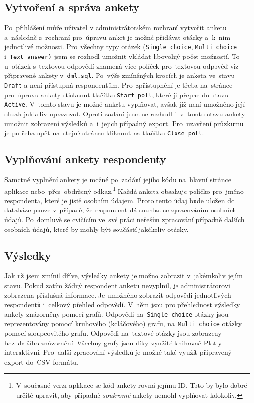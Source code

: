 \documentclass[czech]{pyt-report}
\begin{document}
\subsection{Vytvoření a správa ankety}
Po~přihlášení může uživatel v administrátorském rozhraní vytvořit anketu a~následně z~rozhraní pro~úpravu anket je možné přidávat otázky a~k~nim jednotlivé možnosti. Pro~všechny typy otázek (\texttt{Single choice}, \texttt{Multi choice} i~\texttt{Text answer)} jsem se rozhodl umožnit vkládat libovolný počet možností. To u~otázek s~textovou odpovědí znamená více políček pro~textovou odpověď viz připravené ankety v~\texttt{dml.sql}. Po~výše zmíněných krocích je anketa ve~stavu \texttt{Draft} a není přístupná respondentům. Pro~zpřístupnění je třeba na~stránce pro~úpravu ankety stisknout tlačítko \texttt{Start poll}, které ji přepne do~stavu \texttt{Active}. V~tomto stavu je možné anketu vyplňovat, avšak již není umožněno její obsah jakkoliv upravovat. Oproti zadání jsem se rozhodl i~v~tomto stavu ankety umožnit zobrazení výsledků a~i~jejich případný export. Pro~uzavření průzkumu je potřeba opět na~stejné stránce kliknout na tlačítko \texttt{Close poll}.

\subsection{Vyplňování ankety respondenty}
Samotné vyplnění ankety je možné po~zadání jejího kódu na~hlavní stránce aplikace nebo~přes~obdržený odkaz.\footnote{V~současné verzi aplikace se kód ankety rovná jejímu ID. Toto by bylo dobré určitě upravit, aby případné \emph{soukromé} ankety nemohl vyplňovat kdokoliv.} Každá anketa obsahuje políčko pro~jméno respondenta, které je jistě osobním údajem. Proto tento údaj bude uložen do databáze pouze v~případě, že respondent dá souhlas se zpracováním osobních údajů. Po~domluvě se cvičícím ve~své práci neřeším zpracování případně dalších osobních údajů, které by mohly být součástí jakékoliv otázky.

\subsection{Výsledky}
Jak už jsem zmínil dříve, výsledky ankety je možno zobrazit v~jakémkoliv jejím stavu. Pokud zatím žádný respondent anketu nevyplnil, je administrátorovi zobrazena příslušná informace. Je umožněno zobrazit odpovědi jednotlivých respondentů i~celkový přehled odpovědí. V~něm jsou pro přehlednost výsledky ankety znázorněny pomocí grafů. Odpovědi na~\texttt{Single choice} otázky jsou reprezentovány pomocí kruhového (koláčového) grafu, na~\texttt{Multi choice} otázky pomocí sloupcovitého grafu. Odpovědi na~textové otázky jsou zobrazeny bez~dalšího znázornění. Všechny grafy jsou díky využité knihovně Plotly interaktivní. Pro~další zpracování výsledků je možné také využít připravený export do~CSV formátu.
\end{document}
